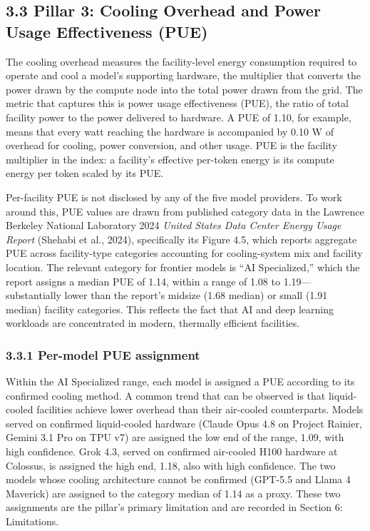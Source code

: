 \documentclass[11pt]{article}
\begin{document}
\subsection*{3.3 Pillar 3: Cooling Overhead and Power Usage Effectiveness (PUE)}

The cooling overhead measures the facility-level energy consumption required to operate and cool a model's supporting hardware, the multiplier that converts the power drawn by the compute node into the total power drawn from the grid. The metric that captures this is power usage effectiveness (PUE), the ratio of total facility power to the power delivered to hardware. A PUE of 1.10, for example, means that every watt reaching the hardware is accompanied by 0.10 W of overhead for cooling, power conversion, and other usage. PUE is the facility multiplier in the index: a facility's effective per-token energy is its compute energy per token scaled by its PUE.

Per-facility PUE is not disclosed by any of the five model providers. To work around this, PUE values are drawn from published category data in the Lawrence Berkeley National Laboratory 2024 \emph{United States Data Center Energy Usage Report} (Shehabi et al., 2024), specifically its Figure 4.5, which reports aggregate PUE across facility-type categories accounting for cooling-system mix and facility location. The relevant category for frontier models is ``AI Specialized,'' which the report assigns a median PUE of 1.14, within a range of 1.08 to 1.19---substantially lower than the report's midsize (1.68 median) or small (1.91 median) facility categories. This reflects the fact that AI and deep learning workloads are concentrated in modern, thermally efficient facilities.

\subsubsection*{3.3.1 Per-model PUE assignment}

Within the AI Specialized range, each model is assigned a PUE according to its confirmed cooling method. A common trend that can be observed is that liquid-cooled facilities achieve lower overhead than their air-cooled counterparts. Models served on confirmed liquid-cooled hardware (Claude Opus 4.8 on Project Rainier, Gemini 3.1 Pro on TPU v7) are assigned the low end of the range, 1.09, with high confidence. Grok 4.3, served on confirmed air-cooled H100 hardware at Colossus, is assigned the high end, 1.18, also with high confidence. The two models whose cooling architecture cannot be confirmed (GPT-5.5 and Llama 4 Maverick) are assigned to the category median of 1.14 as a proxy. These two assignments are the pillar's primary limitation and are recorded in Section 6: Limitations.
\end{document}
